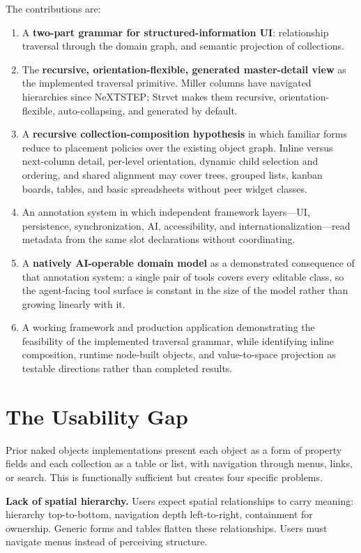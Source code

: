 \documentclass[sigplan,review,anonymous,10pt]{acmart}
\begin{document}
The contributions are:

\begin{enumerate}
\item A \textbf{two-part grammar for structured-information UI}: relationship traversal through the domain graph, and semantic projection of collections.
\item The \textbf{recursive, orientation-flexible, generated master-detail view} as the implemented traversal primitive. Miller columns have navigated hierarchies since NeXTSTEP; Strvct makes them recursive, orientation-flexible, auto-collapsing, and generated by default.
\item A \textbf{recursive collection-composition hypothesis} in which familiar forms reduce to placement policies over the existing object graph. Inline versus next-column detail, per-level orientation, dynamic child selection and ordering, and shared alignment may cover trees, grouped lists, kanban boards, tables, and basic spreadsheets without peer widget classes.
\item An annotation system in which independent framework layers---UI, persistence, synchronization, AI, accessibility, and internationalization---read metadata from the same slot declarations without coordinating.
\item A \textbf{natively AI-operable domain model} as a demonstrated consequence of that annotation system: a single pair of tools covers every editable class, so the agent-facing tool surface is constant in the size of the model rather than growing linearly with it.
\item A working framework and production application demonstrating the feasibility of the implemented traversal grammar, while identifying inline composition, runtime node-built objects, and value-to-space projection as testable directions rather than completed results.
\end{enumerate}

\section{The Usability Gap}
\label{sec:gap}

Prior naked objects implementations present each object as a form of property fields and each collection as a table or list, with navigation through menus, links, or search. This is functionally sufficient but creates four specific problems.

\textbf{Lack of spatial hierarchy.} Users expect spatial relationships to carry meaning: hierarchy top-to-bottom, navigation depth left-to-right, containment for ownership. Generic forms and tables flatten these relationships. Users must navigate menus instead of perceiving structure.
\end{document}

